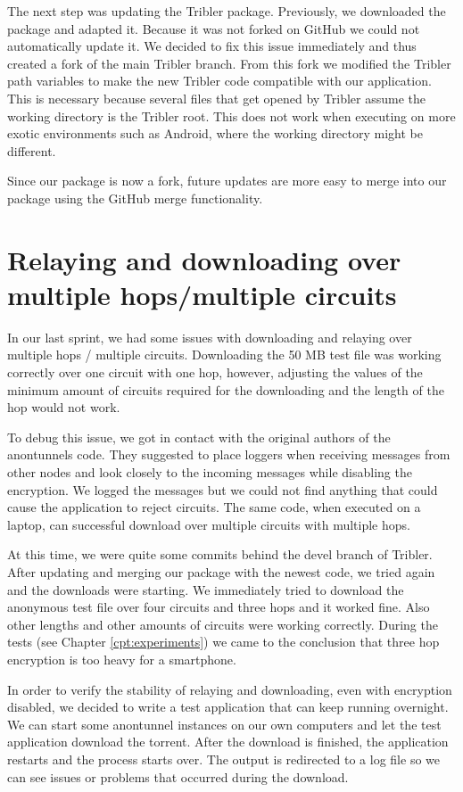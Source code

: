 		The next step was updating the Tribler package. Previously, we downloaded the package and adapted it. Because it was not forked on GitHub we could not automatically update it. We decided to fix this issue immediately and thus created a fork of the main Tribler branch. From this fork we modified the Tribler path variables to make the new Tribler code compatible with our application. This is necessary because several files that get opened by Tribler assume the working directory is the Tribler root. This does not work when executing on more exotic environments such as Android, where the working directory might be different.
		
		Since our package is now a fork, future updates are more easy to merge into our package using the GitHub merge functionality.
			
	\section{Relaying and downloading over multiple hops/multiple circuits}
		In our last sprint, we had some issues with downloading and relaying over multiple hops / multiple circuits. Downloading the 50 MB test file was working correctly over one circuit with one hop, however, adjusting the values of the minimum amount of circuits required for the downloading and the length of the hop would not work.
		
		To debug this issue, we got in contact with the original authors of the anontunnels code. They suggested to place loggers when receiving messages from other nodes and look closely to the incoming messages while disabling the encryption. We logged the messages but we could not find anything that could cause the application to reject circuits. The same code, when executed on a laptop, can successful download over multiple circuits with multiple hops.
		
		At this time, we were quite some commits behind the devel branch of Tribler. After updating and merging our package with the newest code, we tried again and the downloads were starting. We immediately tried to download the anonymous test file over four circuits and three hops and it worked fine. Also other lengths and other amounts of circuits were working correctly. During the tests (see Chapter \ref{cpt:experiments}) we came to the conclusion that three hop encryption is too heavy for a smartphone.
		
		In order to verify the stability of relaying and downloading, even with encryption disabled, we decided to write a test application that can keep running overnight. We can start some anontunnel instances on our own computers and let the test application download the torrent. After the download is finished, the application restarts and the process starts over. The output is redirected to a log file so we can see issues or problems that occurred during the download.
			
